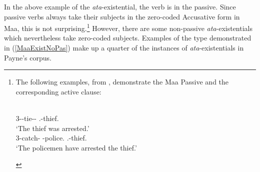 In the above example of the \emph{ata}-existential, the verb is in the passive. 
Since passive verbs always take their subjects in the zero-coded Accusative form in Maa, this is not surprising.\footnote{The following examples, from \citet[ex.16, ex.15]{Payne:2007}, demonstrate the Maa Passive and the corresponding active clause: 
\begin{exe}\ex
\begin{xlist}\ex\gll{} \textbf{}\\
3-\prf{}-tie-\prf{}-\pass{} \mas{}.\sg{}-thief.\acc{}\\
\glt `The thief was arrested.'
\ex\gll{} 	\textbf{}\\
3-catch-\prf{} \pl{}-police.\nom{} \mas{}.\sg{}-thief.\acc{}\\
\glt `The policemen have arrested the thief.'
\end{xlist}
\end{exe}}
However, there are some non-passive \emph{ata}-existentials which nevertheless take zero-coded subjects. 
Examples of the type demonstrated in (\ref{MaaExistNoPas}) make up a quarter of the instances of \emph{ata}-existentials in Payne's corpus. 

\begin{exe}\ex\label{MaaExistNoPas}
\end{exe}

